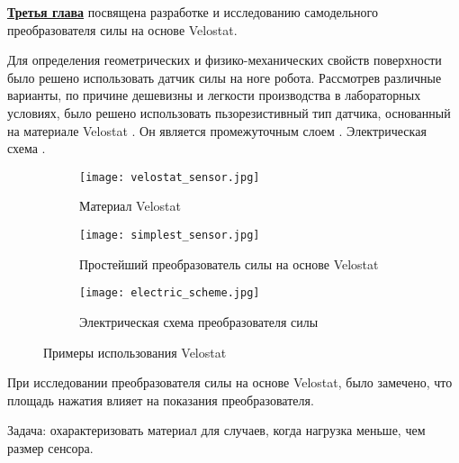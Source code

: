 
\textbf{\underline{Третья глава}} посвящена разработке и исследованию самодельного преобразователя силы на основе Velostat.

Для определения геометрических и физико-механических свойств поверхности было решено использовать датчик силы на ноге робота. Рассмотрев различные варианты, по причине дешевизны и легкости производства в лабораторных условиях, было решено использовать пьзорезистивный тип датчика, основанный на материале Velostat . Он является промежуточным слоем . Электрическая схема . 


\begin{figure}[ht]
    \begin{subfigure}[t]{0.45\textwidth}
        \centering\texttt{[image: velostat\_sensor.jpg]}
        \caption{Материал Velostat}
        \label{fig:velostat_sensor.jpg}
    \end{subfigure}
    \begin{subfigure}[t]{0.45\textwidth}
        \centering\texttt{[image: simplest\_sensor.jpg]}
        \caption{Простейший преобразователь силы на основе Velostat}
        \label{fig:simplest_sensor.jpg}
    \end{subfigure}

    \begin{subfigure}[t]{0.9\textwidth}
        \centering\texttt{[image: electric\_scheme.jpg]}\\
        \caption{Электрическая схема преобразователя силы}
        \label{fig:el_scheme}
    \end{subfigure}
    \caption{Примеры использования Velostat}
\end{figure}

При исследовании преобразователя силы на основе Velostat, было замечено, что площадь нажатия влияет на показания преобразователя. 

Задача: охарактеризовать материал для случаев, когда нагрузка меньше, чем размер сенсора.

